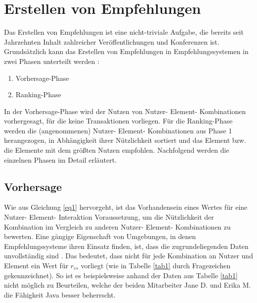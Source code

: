 \section{Erstellen von Empfehlungen}
\label{ch:empfehlungssysteme:empfehlungserstellung}
Das Erstellen von Empfehlungen ist eine nicht-triviale Aufgabe, die bereits seit Jahrzehnten Inhalt zahlreicher Veröffentlichungen und Konferenzen ist.
Grundsätzlich kann das Erstellen von Empfehlungen in Empfehlungssystemen in zwei Phasen unterteilt werden \cite[S. 405]{unternährer:article}\cite[S. 854]{ricci:book}:
\begin{enumerate}
	\item Vorhersage-Phase
	\item Ranking-Phase
\end{enumerate}

In der Vorhersage-Phase wird der Nutzen von Nutzer- Element- Kombinationen vorhergesagt, für die keine Transaktionen vorliegen.
Für die Ranking-Phase werden die (angenommenen) Nutzer- Element- Kombinationen aus Phase 1 herangezogen, in Abhängigkeit ihrer Nützlichkeit sortiert und das Element bzw. die Elemente mit dem größten Nutzen empfohlen.
Nachfolgend werden die einzelnen Phasen im Detail erläutert.

\subsection{Vorhersage}
\label{ch:empfehlungssysteme:empfehlungserstellung:prediction}
Wie aus Gleichung \ref{eq1} hervorgeht, ist das Vorhandensein eines Wertes für eine Nutzer- Element- Interaktion Voraussetzung, um die Nützlichkeit der Kombination im Vergleich zu anderen Nutzer- Element- Kombinationen zu bewerten.
Eine gängige Eigenschaft von Umgebungen, in denen Empfehlungssysteme ihren Einsatz finden, ist, dass die zugrundeliegenden Daten unvollständig sind \cite[S. 735]{adomavicius:inproceedings}.
Das bedeutet, dass nicht für jede Kombination an Nutzer und Element ein Wert für $r_{cs}$ vorliegt (wie in Tabelle \ref{tab1} durch Fragezeichen gekennzeichnet).
So ist es beispielsweise anhand der Daten aus Tabelle \ref{tab1} nicht möglich zu Beurteilen, welche der beiden Mitarbeiter Jane D. und Erika M. die Fähigkeit Java besser beherrscht.

